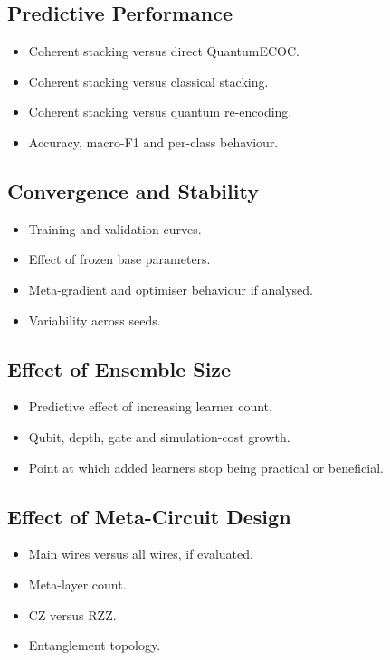 \documentclass[]{UCD_CS_MSc_AAI_Report}
\begin{document}
\subsection{Predictive Performance}
\begin{itemize}
    \item Coherent stacking versus direct QuantumECOC.
    \item Coherent stacking versus classical stacking.
    \item Coherent stacking versus quantum re-encoding.
    \item Accuracy, macro-F1 and per-class behaviour.
\end{itemize}

\subsection{Convergence and Stability}
\begin{itemize}
    \item Training and validation curves.
    \item Effect of frozen base parameters.
    \item Meta-gradient and optimiser behaviour if analysed.
    \item Variability across seeds.
\end{itemize}

\subsection{Effect of Ensemble Size}
\begin{itemize}
    \item Predictive effect of increasing learner count.
    \item Qubit, depth, gate and simulation-cost growth.
    \item Point at which added learners stop being practical or beneficial.
\end{itemize}

\subsection{Effect of Meta-Circuit Design}
\begin{itemize}
    \item Main wires versus all wires, if evaluated.
    \item Meta-layer count.
    \item CZ versus RZZ.
    \item Entanglement topology.
\end{itemize}
\end{document}
